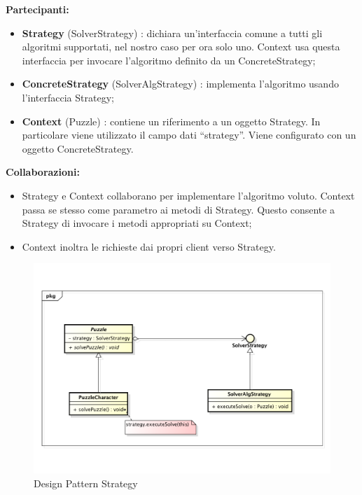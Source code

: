 \textbf{Partecipanti:}
		\begin{itemize}
			\item \textbf{Strategy} (SolverStrategy) :  dichiara un'interfaccia comune a tutti gli algoritmi supportati, nel nostro caso per ora solo uno. Context usa questa interfaccia per invocare l'algoritmo definito da un ConcreteStrategy;
			\item \textbf{ConcreteStrategy} (SolverAlgStrategy) : implementa l'algoritmo usando l'interfaccia Strategy;
			\item \textbf{Context} (Puzzle) : contiene un riferimento a un oggetto Strategy. In particolare viene utilizzato il campo dati ``strategy''. Viene configurato con un oggetto ConcreteStrategy.
		\end{itemize}
\noindent
\textbf{Collaborazioni:}
		\begin{itemize}
			\item Strategy e Context collaborano per implementare l'algoritmo voluto. Context passa se stesso come parametro ai metodi di Strategy. Questo consente a Strategy di invocare i metodi appropriati su Context;
			\item Context inoltra le richieste dai propri client verso Strategy.
		\end{itemize}
\noindent
	\begin{figure}[htbp]
		\centering
		\includegraphics[width=15cm]{img/DesignPatternStrategy.pdf}
		\caption{Design Pattern Strategy}
		\label{Design Pattern Strategy}
	\end{figure}


